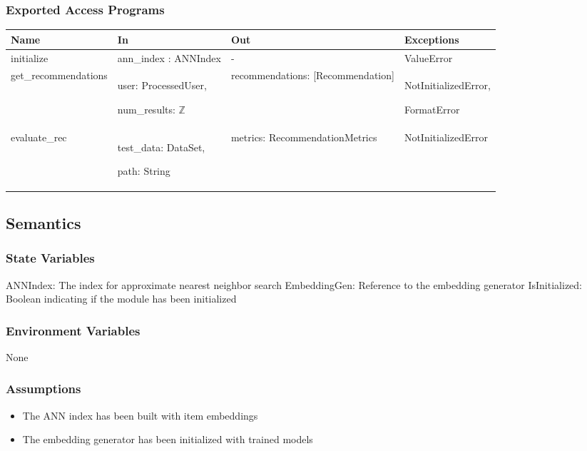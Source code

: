 \documentclass[12pt, titlepage]{article}
\begin{document}
\subsubsection{Exported Access Programs}

\begin{center}
\begin{tabular}{p{4cm} p{4cm} p{4cm} p{3cm}}
\hline
\textbf{Name} & \textbf{In} & \textbf{Out} & \textbf{Exceptions} \\
\hline
initialize & ann\_index : ANNIndex& -& ValueError \\
\hline
get\_recommendations & user: ProcessedUser,

num\_results: $\mathbb{Z}$ & recommendations: [Recommendation] & NotInitializedError,

FormatError \\
\hline
evaluate\_rec & test\_data: DataSet,

path: String & metrics: RecommendationMetrics & NotInitializedError \\
\hline
\end{tabular}
\end{center}

\subsection{Semantics}

\subsubsection{State Variables}
ANNIndex: The index for approximate nearest neighbor search
EmbeddingGen: Reference to the embedding generator
IsInitialized: Boolean indicating if the module has been initialized

\subsubsection{Environment Variables}

None

\subsubsection{Assumptions}

\begin{itemize}
  \item The ANN index has been built with item embeddings
  \item The embedding generator has been initialized with trained models
\end{itemize}
\end{document}
